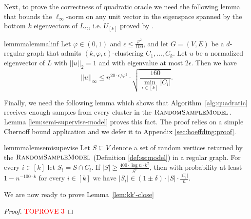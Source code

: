 \documentclass[letterpaper,11pt]{article}
\newcommand{\rsm}{\textsc{RandomSampleModel}}
\theoremstyle{plain}
\theoremstyle{definition}
\theoremstyle{remark}
\newcommand{\e}{\epsilon}
\begin{document}
Next, to prove the correctness of quadratic oracle we need the following lemma that bounds the $\ell_\infty$-norm on any unit vector in the eigenspace spanned by the bottom $k$ eigenvectors of $L_G$, i.e. $U_{[k]}$ proved by \cite{GluchKLMS21}.

\begin{restatable}{lemmma}{lemmalinf}\label{lem:l-inf-bnd}
Let $\varphi\in(0,1)$ and $\epsilon \leq \frac{\varphi^2}{100}$, and let $G=(V,E)$ be a $d$-regular graph that admits $(k,\varphi,\e)$-clustering $C_1, \ldots, C_k$.  Let $u$ be a normalized eigenvector of $L$ with $||u||_2=1$ and with eigenvalue at most $2\epsilon$.     Then we have 
\[||u||_\infty \leq  n^{20\cdot\epsilon /\varphi^2}\cdot \sqrt{\frac{160}{\min_{i\in [k]}|C_i|}} \text{.} \]
\end{restatable}

Finally, we need the following lemma which shows that Algorithm~\ref{alg:quadratic} receives enough samples from 
every cluster in the $\rsm$. Lemma \ref{lem:semi-supervise-model} proves this 
fact. The proof relies on a simple Chernoff bound application and we defer it to 
Appendix \ref{sec:hoeffding:proof}.

\begin{restatable}{lemmma}{lemsemisupevise} \label{lem:semi-supervise-model}
Let $S\subseteq V$ denote a set of random vertices returned by the $\rsm$ (Definition \ref{def:ss:model}) in a regular graph. For every $i\in [k]$ let $S_i=S\cap C_i$. If $|S| \geq \frac{400\cdot \log n\cdot k^2}{\delta^2}$, then with probability at least $1-n^{-100\cdot k}$ for every $i\in[k]$ we have $|S_i|\in (1\pm \delta)\cdot |S|\cdot \frac{|C_i|}{n}$.
\end{restatable}

We are now ready to prove Lemma~\ref{lem:kk'-close}
\begin{proof}\textcolor{red}{TOPROVE 3}\end{proof}




 
\end{document}
